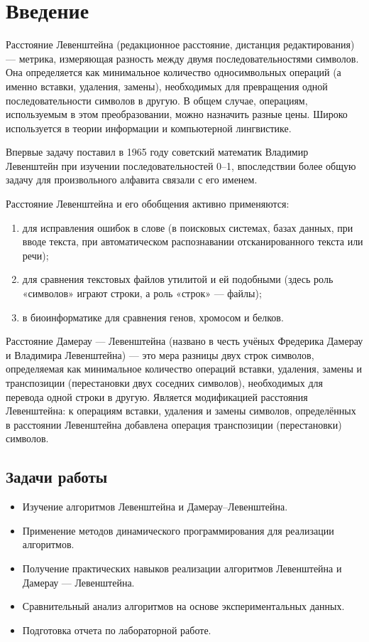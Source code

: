 \chapter*{Введение}

Расстояние Левенштейна (редакционное расстояние, дистанция редактирования) — метрика, измеряющая разность между двумя последовательностями символов. Она определяется как минимальное количество односимвольных операций (а именно вставки, удаления, замены), необходимых для превращения одной последовательности символов в другую. В общем случае, операциям, используемым в этом преобразовании, можно назначить разные цены. Широко используется в теории информации и компьютерной лингвистике.

Впервые задачу поставил в 1965 году советский математик Владимир Левенштейн при изучении последовательностей 0--1, впоследствии более общую задачу для произвольного алфавита связали с его именем.

Расстояние Левенштейна и его обобщения активно применяются: 
\begin{enumerate}[label={\arabic*)}]
	\item для исправления ошибок в слове (в поисковых системах, базах данных, при вводе текста, при автоматическом распознавании отсканированного текста или речи);
	\item для сравнения текстовых файлов утилитой  и ей подобными (здесь роль «символов» играют строки, а роль «строк» — файлы);
	\item в биоинформатике для сравнения генов, хромосом и белков.
\end{enumerate}

Расстояние Дамерау — Левенштейна (названо в честь учёных Фредерика Дамерау и Владимира Левенштейна) — это мера разницы двух строк символов, определяемая как минимальное количество операций вставки, удаления, замены и транспозиции (перестановки двух соседних символов), необходимых для перевода одной строки в другую. Является модификацией расстояния Левенштейна: к операциям вставки, удаления и замены символов, определённых в расстоянии Левенштейна добавлена операция транспозиции (перестановки) символов.

\section*{Задачи работы}

\begin{itemize}
	\item Изучение алгоритмов Левенштейна и Дамерау--Левенштейна.
	\item Применение методов динамического программирования для реализации алгоритмов.
	\item Получение практических навыков реализации алгоритмов Левенштейна и Дамерау — Левенштейна.
	\item Сравнительный анализ алгоритмов на основе экспериментальных данных.
	\item Подготовка отчета по лабораторной работе.
\end{itemize}
